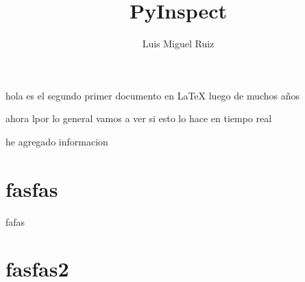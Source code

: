 \documentclass[10pt]{article}
\begin{document}
\title{PyInspect}
\author{Luis Miguel Ruiz}

\maketitle

hola es el segundo primer documento en LaTeX luego de muchos años

ahora lpor lo general vamos a ver si esto lo hace en tiempo real

he agregado informacion

\section[x1]{fasfas}

fafas


\section[x1]{fasfas2}
\end{document}
